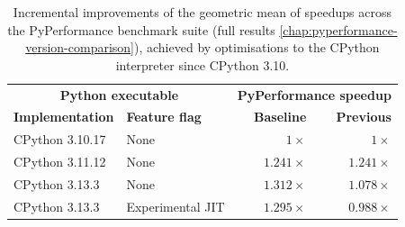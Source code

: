 \begin{table}[H]
  \caption{Incremental improvements of the geometric mean of speedups across the PyPerformance benchmark suite (full results \autoref{chap:pyperformance-version-comparison}), achieved by optimisations to the CPython interpreter since CPython 3.10.}
  \label{tab:faster-cpython}
  \centering
  \begin{tabular}{llrr}
    \toprule
    \multicolumn{2}{c}{\textbf{Python executable}} & \multicolumn{2}{c}{\textbf{PyPerformance speedup}}\\
    \cmidrule(r){1-2} \cmidrule(r){3-4}
    \textbf{Implementation} & \textbf{Feature flag} & \textbf{Baseline} & \textbf{Previous} \\
    \midrule
    CPython 3.10.17 & None & $1\times$ & $1\times$ \\
    CPython 3.11.12 & None & $1.241\times$ & $1.241\times$ \\
    CPython 3.13.3 & None & $1.312\times$ & $1.078\times$ \\
    CPython 3.13.3 & Experimental JIT & $1.295\times$ & $0.988\times$ \\
    \bottomrule
  \end{tabular}
\end{table}

